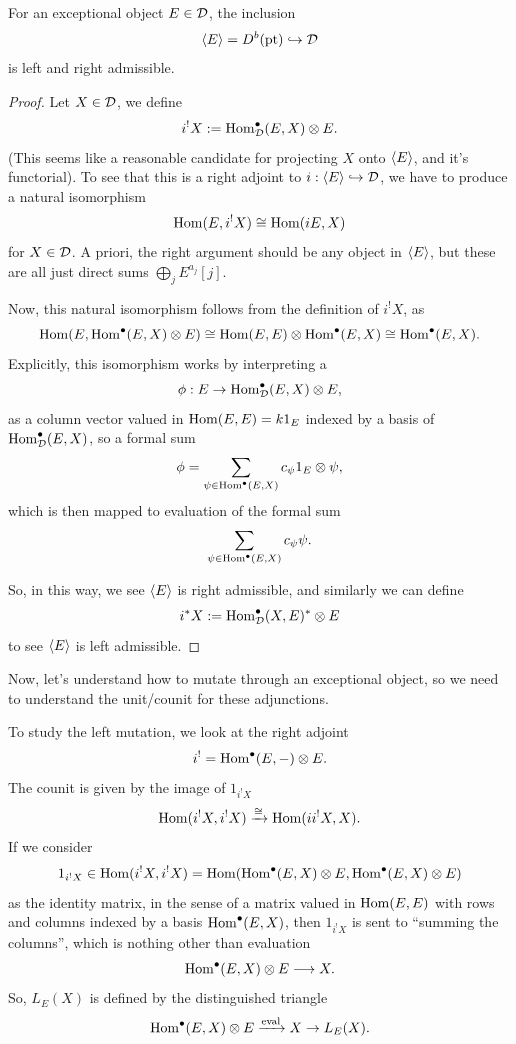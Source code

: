 \documentclass[12pt]{article}
\begin{document}
\begin{prop}
    For an exceptional object $E\in \mathcal{D}$, the inclusion
    \[\left\langle E\right\rangle = D^b(\mathrm{pt}) \hookrightarrow \mathcal{D}\]
    is left and right admissible.
\end{prop}
\begin{proof}
    Let $X\in \mathcal{D}$, we define
    \[i^! X := \mathrm{Hom}^\bullet_{\mathcal{D}}(E,X) \otimes E.\]
    (This seems like a reasonable candidate for projecting $X$ onto $\left\langle E\right\rangle$, and it's functorial). To see that this is a right adjoint to $i:\left\langle E\right\rangle\hookrightarrow \mathcal{D}$, we have to produce a natural isomorphism
    \[\mathrm{Hom}(E,i^! X) \cong \mathrm{Hom}(i E,X)\]
    for $X\in \mathcal{D}$. A priori, the right argument should be any object in $\left\langle E\right\rangle$, but these are all just direct sums $\bigoplus_j E^{a_j}[j]$.

    Now, this natural isomorphism follows from the definition of $i^! X$, as
    \[\mathrm{Hom}(E,\mathrm{Hom}^\bullet(E,X)\otimes E) \cong \mathrm{Hom}(E,E) \otimes \mathrm{Hom}^\bullet(E,X) \cong \mathrm{Hom}^\bullet(E,X).\]
    Explicitly, this isomorphism works by interpreting a 
    \[\phi: E \to \Hom^\bullet_\cD(E,X)\otimes E,\]
    as a column vector valued in $\mathrm{Hom}(E,E)=k1_E$ indexed by a basis of $\mathrm{Hom}^\bullet_{\mathcal{D}}(E,X)$, so a formal sum
    \[\phi = \sum_{\psi \in \Hom^\bullet(E,X)} c_\psi 1_E \otimes \psi,\]
    which is then mapped to evaluation of the formal sum
    \[\sum_{\psi \in \mathrm{Hom}^\bullet(E,X)} c_\psi \psi.\]
    
    So, in this way, we see $\left\langle E\right\rangle$ is right admissible, and similarly we can define
    \[i^* X := \mathrm{Hom}^\bullet_{\mathcal{D}}(X,E)^* \otimes E\]
    to see $\left\langle E\right\rangle$ is left admissible.
\end{proof}

Now, let's understand how to mutate through an exceptional object, so we need to understand the unit/counit for these adjunctions.

To study the left mutation, we look at the right adjoint
\[i^! = \mathrm{Hom}^\bullet(E,-)\otimes E.\]
The counit is given by the image of $1_{i^! X}$
\[\mathrm{Hom}(i^! X, i^! X) \xrightarrow{\cong} \mathrm{Hom}(i i^! X, X).\]
If we consider
\[1_{i^! X} \in \mathrm{Hom}(i^! X, i^! X) = \mathrm{Hom}(\mathrm{Hom}^\bullet(E,X) \otimes E, \mathrm{Hom}^\bullet(E,X) \otimes E)\]
as the identity matrix, in the sense of a matrix valued in $\mathrm{Hom}(E,E)$ with rows and columns indexed by a basis $\mathrm{Hom}^\bullet(E,X)$, then $1_{i^! X}$ is sent to ``summing the columns'', which is nothing other than evaluation
\[\mathrm{Hom}^\bullet(E,X) \otimes E \longrightarrow X.\]
So, $L_E(X)$ is defined by the distinguished triangle
\[\mathrm{Hom}^\bullet(E,X) \otimes E \xrightarrow{\mathrm{eval}} X \to L_E(X).\]
\end{document}
